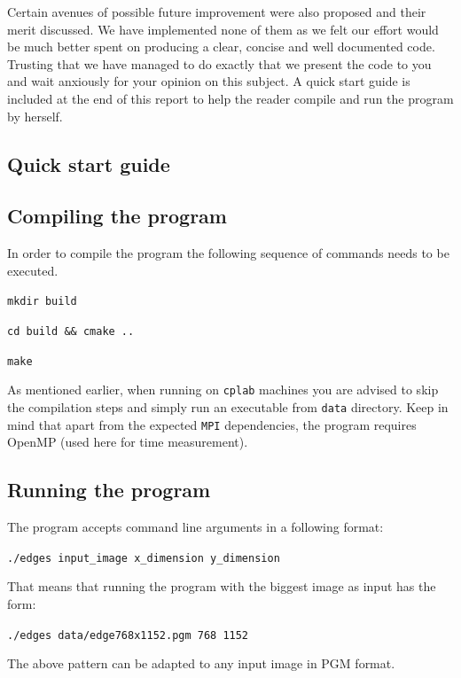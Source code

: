 \documentclass[11pt,a4paper]{article}
\begin{document}
Certain avenues of possible future improvement were also proposed and their merit discussed.
We have implemented none of them as we felt our effort would be much better spent on producing a clear, concise and well documented code.
Trusting that we have managed to do exactly that we present the code to you and wait anxiously for your opinion on this subject.
A quick start guide is included at the end of this report to help the reader compile and run the program by herself.



\newpage
\begin{appendices}
\section{Quick start guide}
\subsection{Compiling the program}
\label{sec:comp}
In order to compile the program the following sequence of commands needs to be executed.

\vspace{5pt}
\noindent \texttt{mkdir build}

\noindent \texttt{cd build \&\& cmake ..}

\noindent \texttt{make}
\vspace{5pt}

\noindent As mentioned earlier, when running on \texttt{cplab} machines you are advised to skip the compilation steps and simply run an executable from \texttt{data} directory.
Keep in mind that apart from the expected \texttt{MPI} dependencies, the program requires OpenMP (used here for time measurement).

\subsection{Running the program}
The program accepts command line arguments in a following format:

\vspace{5pt}
\noindent \texttt{./edges input\_image x\_dimension y\_dimension}
\vspace{5pt}

\noindent That means that running the program with the biggest image as input has the form:

\vspace{5pt}
\noindent \texttt{./edges data/edge768x1152.pgm 768 1152}
\vspace{5pt}

\noindent The above pattern can be adapted to any input image in PGM format.

\end{appendices}
\end{document}
